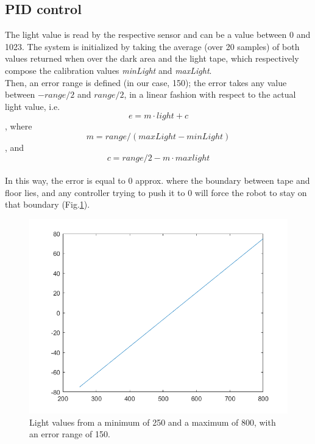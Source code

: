 \documentclass[a4paper,11pt,oneside]{book}
\begin{document}
			\subsection{PID control}
			The light value is read by the respective sensor and can be a value between 0 and 1023.
			The system is initialized by taking the average (over 20 samples) of both values returned when over the dark area and the light tape, which respectively compose the calibration values \emph{minLight} and \emph{maxLight}.\\
			Then, an error range is defined (in our case, 150); the error takes any value between $-range/2$ and $range/2$, in a linear fashion with respect to the actual light value, i.e. $$e=m\cdot \mathit{light}+c$$, where $$m=\mathit{range}/(\mathit{maxLight-minLight})$$, and $$c=\mathit{range}/2-m\cdot \mathit{maxlight}$$\\
			In this way, the error is equal to 0 approx. where the boundary between tape and floor lies, and any controller trying to push it to 0 will force the robot to stay on that boundary (Fig.\ref{fig:lightError.png}).\\
			\begin{figure} [H]
				\centering
				\includegraphics[scale=0.45]{figs/lightError.png}
				\caption{Light values from a minimum of 250 and a maximum of 800, with an error range of 150.}\label{fig:lightError.png}
			\end{figure}
			
\end{document}
